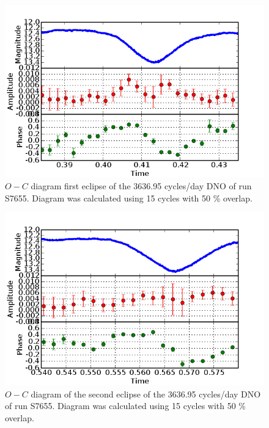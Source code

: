\begin{figure}
 \centering
 \includegraphics[width = 0.8\columnwidth, bb=0 0 600 400]{images/run2_eclipse1_oc.png}
 \caption[$O-C$ diagram first eclipse of the 3636.95 cycles/day DNO of run S7655.]{$O-C$ diagram first eclipse of the 3636.95 cycles/day DNO of run S7655. Diagram was calculated using 15 cycles with 50 \% overlap.}
 \label{OC_S7655_eclipse1}
\end{figure}

\begin{figure}
 \centering
 \includegraphics[width = 0.8\columnwidth, bb=0 0 600 400]{images/run2_eclipse2_oc.png}
 \caption[$O-C$ diagram of the second eclipse of the 3636.95 cycles/day DNO of run S7655.]{$O-C$ diagram of the second eclipse of the 3636.95 cycles/day DNO of run S7655. Diagram was calculated using 15 cycles with 50 \% overlap.}
 \label{OC_S7655_eclipse2}
\end{figure}

